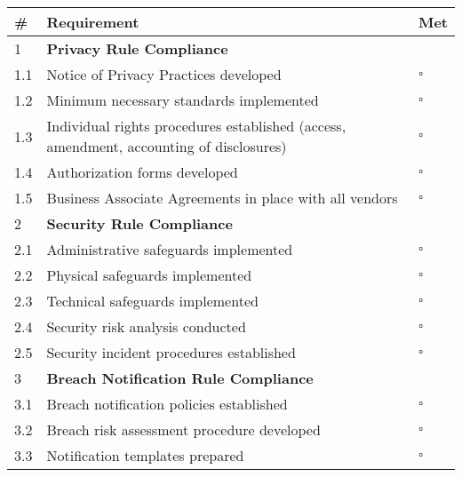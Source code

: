 \begin{tcolorbox}[title=HIPAA Compliance Checklist for Digital Health Applications]
\begin{tabular}{|p{1cm}|p{12cm}|p{1cm}|}
\hline
\textbf{\#} & \textbf{Requirement} & \textbf{Met} \\
\hline
1 & \textbf{Privacy Rule Compliance} & \\
\hline
1.1 & Notice of Privacy Practices developed & $\square$ \\
\hline
1.2 & Minimum necessary standards implemented & $\square$ \\
\hline
1.3 & Individual rights procedures established (access, amendment, accounting of disclosures) & $\square$ \\
\hline
1.4 & Authorization forms developed & $\square$ \\
\hline
1.5 & Business Associate Agreements in place with all vendors & $\square$ \\
\hline
2 & \textbf{Security Rule Compliance} & \\
\hline
2.1 & Administrative safeguards implemented & $\square$ \\
\hline
2.2 & Physical safeguards implemented & $\square$ \\
\hline
2.3 & Technical safeguards implemented & $\square$ \\
\hline
2.4 & Security risk analysis conducted & $\square$ \\
\hline
2.5 & Security incident procedures established & $\square$ \\
\hline
3 & \textbf{Breach Notification Rule Compliance} & \\
\hline
3.1 & Breach notification policies established & $\square$ \\
\hline
3.2 & Breach risk assessment procedure developed & $\square$ \\
\hline
3.3 & Notification templates prepared & $\square$ \\
\hline
\end{tabular}
\end{tcolorbox}

